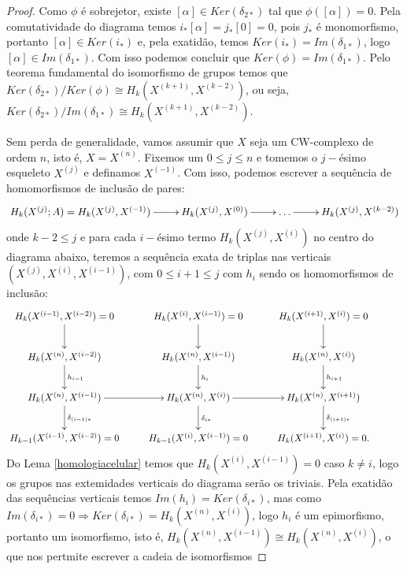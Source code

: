 \documentclass[12pt]{book}
\newcommand{\classe}[1]{[#1]}
\newcommand{\homologia}[2]{H_{#1}(#2;A)}
\newcommand{\homologiarel}[3]{H_{#1}(#2,#3)}
\newcommand{\homologiarelskele}[3]{H_{#1}(X^{(#2)}, X^{(#3)})}
\newcommand{\skeleton}[1]{X^{(#1)}}
\begin{document}
\begin{proof}
		Como $\phi$ é sobrejetor, existe $\classe{\alpha} \in Ker(\delta_{2*})$ tal que $\phi(\classe{\alpha}) = 0$. Pela comutatividade do diagrama temos $i_{*}{\classe{\alpha}} = j_{*}\classe{0} = 0$, pois $j_{*}$ é monomorfismo, portanto $\classe{\alpha} \in Ker(i_{*})$ e, pela exatidão, temos $Ker(i_{*})=Im(\delta_{1*})$, logo $\classe{\alpha} \in Im(\delta_{1*})$. Com isso podemos concluir que $Ker(\phi) = Im(\delta_{1*})$. Pelo teorema fundamental do isomorfismo de grupos temos que $Ker(\delta_{2*})/Ker(\phi) \cong \homologiarelskele{k}{k+1}{k-2}$, ou seja, $Ker(\delta_{2*})/Im(\delta_{1*}) \cong \homologiarelskele{k}{k+1}{k-2}$.
		
		Sem perda de generalidade, vamos assumir que $X$ seja um CW-complexo de ordem $n$, isto é, $X= \skeleton{n}$. Fixemos um $0 \leq j \leq n$ e tomemos o $j-$ésimo esqueleto $\skeleton{j}$ e definamos $\skeleton{-1}$. Com isso, podemos escrever a sequência de homomorfismos de inclusão de pares:
		$$
		\xymatrix{
			\homologia{k}{\skeleton{j}} = \homologiarel{k}{\skeleton{j}}{\skeleton{-1}}\ar[r]& \homologiarel{k}{\skeleton{j}}{\skeleton{0}} \ar[r] & \dots \ar[r] & \homologiarel{k}{\skeleton{j}}{\skeleton{k-2}}
		}
		$$
		onde $k-2 \leq j$ e para cada $i-$ésimo termo $\homologiarelskele{k}{j}{i}$ no centro do diagrama abaixo, teremos a sequência exata de triplas nas verticais $(\skeleton{j}, \skeleton{i}, \skeleton{i-1})$, com $0\leq i +1\leq j$ com $h_{i}$ sendo os homomorfismos de inclusão:
		$$
		\xymatrix{
			\homologiarel{k}{\skeleton{i-1}}{\skeleton{i-2}}=0 \ar[d] & \homologiarel{k}{\skeleton{i}}{\skeleton{i-1}}=0 \ar[d] & \homologiarel{k}{\skeleton{i+1}}{\skeleton{i}}=0 \ar[d] &	
			\\
			\homologiarel{k}{\skeleton{n}}{\skeleton{i-2}} \ar[d]^{h_{i-1}} & \homologiarel{k}{\skeleton{n}}{\skeleton{i-1}} \ar[d]^{h_{i}} & \homologiarel{k}{\skeleton{n}}{\skeleton{i}} \ar[d]^{h_{i+1}}
			\\
			\homologiarel{k}{\skeleton{n}}{\skeleton{i-1}} \ar[r]\ar[d]^{\delta_{(i-1)*}}& \homologiarel{k}{\skeleton{n}}{\skeleton{i}} \ar[r] \ar[d]^{\delta_{i*}} &  \homologiarel{k}{\skeleton{n}}{\skeleton{i+1}} \ar[d]^{\delta_{(i+1)*}} 
			\\
			\homologiarelskele{k-1}{i-1}{i-2}=0& \homologiarel{k-1}{\skeleton{i}}{\skeleton{i-1}}=0 &  \homologiarel{k}{\skeleton{i+1}}{\skeleton{i}}=0. &		
		}
		$$
		Do Lema \ref{homologiacelular} temos que $\homologiarelskele{k}{i}{i-1} =0$ caso $k \neq i$, logo os grupos nas extemidades verticais do diagrama serão os triviais. Pela exatidão das sequências verticais temos $Im(h_{i}) = Ker(\delta_{i*})$, mas como $Im(\delta_{i*}) = 0 \Rightarrow Ker(\delta_{i*}) = \homologiarel{k}{\skeleton{n}}{\skeleton{i}}$, logo $h_{i}$ é um epimorfismo, portanto um isomorfismo, isto é, $\homologiarel{k}{\skeleton{n}}{\skeleton{i-1}} \cong \homologiarel{k}{\skeleton{n}}{\skeleton{i}}$, o que nos pertmite escrever a cadeia de isomorfismos 

\end{proof}
\end{document}

